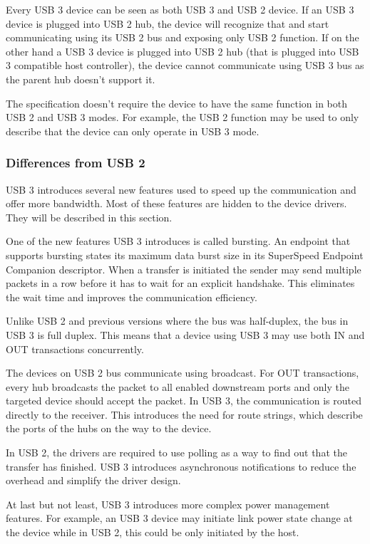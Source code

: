 
Every USB 3 device can be seen as both USB 3 and USB 2 device. If an USB 3
device is plugged into USB 2 hub, the device will recognize that and start
communicating using its USB 2 bus and exposing only USB 2 function.
If on the other hand a USB 3 device is plugged into USB 2 hub (that is plugged
into USB 3 compatible host controller), the device cannot communicate using USB
3 bus as the parent hub doesn't support it.

The specification doesn't require the device to have the same function in both
USB 2 and USB 3 modes. For example, the USB 2 function may be used to only
describe that the device can only operate in USB 3 mode.

\subsubsection{Differences from USB 2}

USB 3 introduces several new features used to speed up the communication and
offer more bandwidth. Most of these features are hidden to the device drivers.
They will be described in this section.

One of the new features USB 3 introduces is called bursting. An endpoint that
supports bursting states its maximum data burst size in its SuperSpeed Endpoint
Companion descriptor. When a transfer is initiated the sender may send multiple
packets in a row before it has to wait for an explicit handshake. This
eliminates the wait time and improves the communication efficiency.

Unlike USB 2 and previous versions where the bus was half-duplex, the bus in USB
3 is full duplex. This means that a device using USB 3 may use both IN and OUT
transactions concurrently.

The devices on USB 2 bus communicate using broadcast. For OUT transactions,
every hub broadcasts the packet to all enabled downstream ports and only the
targeted device should accept the packet. In USB 3, the communication is
routed directly to the receiver. This introduces the need for route strings,
which describe the ports of the hubs on the way to the device.

In USB 2, the drivers are required to use polling as a way to find out that the
transfer has finished. USB 3 introduces asynchronous notifications to reduce
the overhead and simplify the driver design.

At last but not least, USB 3 introduces more complex power management
features. For example, an USB 3 device may initiate link power state change at
the device while in USB 2, this could be only initiated by the host.
